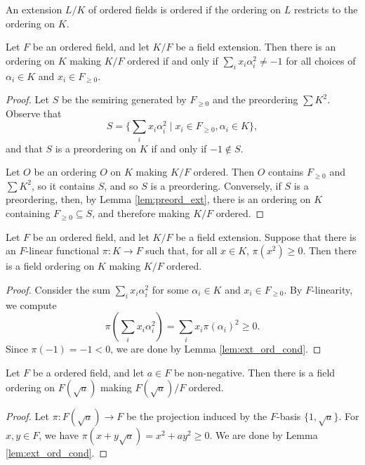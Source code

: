 \begin{definition}
  \label{def:ordered_ext}
  An extension $L/K$ of ordered fields is ordered if the ordering on $L$ restricts to the ordering on $K$.
\end{definition}

\begin{lemma}
  \label{lem:ext_ord_cond}
  Let $F$ be an ordered field, and let $K/F$ be a field extension. Then there is an ordering on $K$ making $K/F$ ordered if and only if $\sum_i x_i\alpha_i^2\neq-1$ for all choices of $\alpha_i\in K$ and $x_i\in F_{\geq0}$.
\end{lemma}
\begin{proof}
  Let $S$ be the semiring generated by $F_{\geq0}$ and the preordering $\sum K^2$. Observe that
  \[S=\{\sum_i x_i\alpha_i^2\mid x_i\in F_{\geq0},\alpha_i\in K\},\]
  and that $S$ is a preordering on $K$ if and only if $-1\notin S$.

  Let $O$ be an ordering $O$ on $K$ making $K/F$ ordered. Then $O$ contains $F_{\geq0}$ and $\sum K^2$, so it contains $S$, and so $S$ is a preordering. Conversely, if $S$ is a preordering, then, by Lemma \ref{lem:preord_ext}, there is an ordering on $K$ containing $F_{\geq0}\subseteq S$, and therefore making $K/F$ ordered.
\end{proof}

\begin{lemma}
  \label{lem:ext_ord_functional_suff}
  Let $F$ be an ordered field, and let $K/F$ be a field extension. Suppose that there is an $F$-linear functional $\pi:K\to F$ such that, for all $x\in K$, $\pi(x^2)\geq0$. Then there is a field ordering on $K$ making $K/F$ ordered.
\end{lemma}
\begin{proof}
  Consider the sum $\sum_i x_i\alpha_i^2$ for some $\alpha_i\in K$ and $x_i\in F_{\geq0}$. By $F$-linearity, we compute
  \[\pi(\sum_i x_i\alpha_i^2)=\sum_i x_i\pi(\alpha_i)^2\geq0.\]
  Since $\pi(-1)=-1<0$, we are done by Lemma \ref{lem:ext_ord_cond}.
\end{proof}

\begin{corollary}
  \label{cor:ext_ord_to_adj_sqrt}
  Let $F$ be a ordered field, and let $a\in F$ be non-negative. Then there is a field ordering on $F(\sqrt{a})$ making $F(\sqrt{a})/F$ ordered.
\end{corollary}
\begin{proof}
  Let $\pi:F(\sqrt{a})\to F$ be the projection induced by the $F$-basis $\{1,\sqrt{a}\}$. For $x,y\in F$, we have $\pi(x+y\sqrt{a})=x^2+ay^2\geq0$. We are done by Lemma \ref{lem:ext_ord_cond}.
\end{proof}

